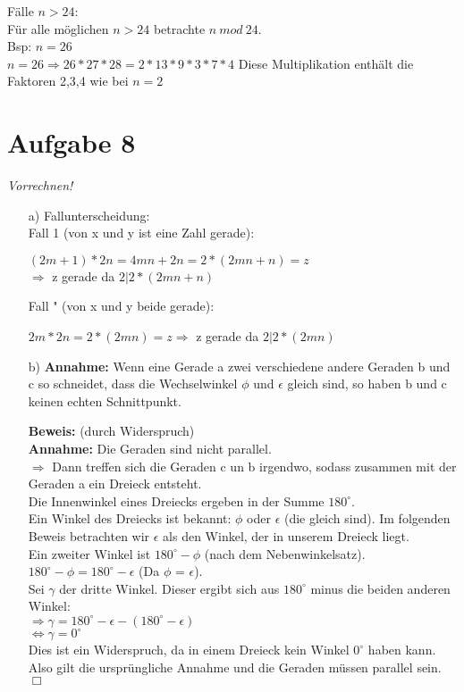 \documentclass[paper = a4, ngerman]{scrartcl}
\begin{document}
\begin{itemize}
			Fälle $n>24$:\\
				Für alle möglichen $n>24$ betrachte $n\ mod\ 24$.\\
				Bsp: $n=26$\\
				$n=26 \Rightarrow 26*27*28 = 2*13*9*3*7*4$
				Diese Multiplikation enthält die Faktoren 2,3,4 wie bei $n=2$
		\end{itemize}
\pagebreak
\section*{Aufgabe 8}
\textit{Vorrechnen!}
	\begin{itemize}
		\item[a)] Fallunterscheidung:\\
		Fall 1 (von x und y ist eine Zahl gerade):
		\begin{center}
			$(2m + 1) * 2n = 4mn + 2n = 2*(2mn + n) = z $\\$\Rightarrow$ z gerade da $2|2*(2mn + n)$
		\end{center}
		Fall " (von x und y beide gerade):
		\begin{center}
			$2m * 2n = 2*(2mn) = z \Rightarrow$ z gerade da $2|2*(2mn)$
		\end{center}
	
		\item[b)]
		\textbf{Annahme:} Wenn eine Gerade a zwei verschiedene andere Geraden b und c so schneidet, dass die Wechselwinkel
		$\phi$ und $\epsilon$ gleich sind, so haben b und c keinen echten Schnittpunkt.
		
		\textbf{Beweis:} (durch Widerspruch)\\
		\textbf{Annahme:} Die Geraden sind nicht parallel.\\
		
		$\Rightarrow$ Dann treffen sich die Geraden c un b irgendwo, sodass zusammen mit der Geraden a ein Dreieck entsteht.\\
		
		Die Innenwinkel eines Dreiecks ergeben in der Summe $180^\circ$.\\
		
		Ein Winkel des Dreiecks ist bekannt: $\phi$ oder $\epsilon$ (die gleich sind). Im folgenden Beweis betrachten wir $\epsilon$ als den Winkel, der in unserem Dreieck liegt.\\
		Ein zweiter Winkel ist $180^\circ - \phi$ (nach dem Nebenwinkelsatz).\\ $180^\circ - \phi = 180^\circ - \epsilon$ (Da $\phi$ = $\epsilon$).\\
		
		Sei $\gamma$ der dritte Winkel. Dieser ergibt sich aus $180^\circ$ minus die beiden anderen Winkel:\\
		$\Rightarrow \gamma = 180^\circ - \epsilon - (180^\circ - \epsilon) $ \\
		$\Leftrightarrow \gamma = 0^\circ$\\
		
		Dies ist ein Widerspruch, da in einem Dreieck kein Winkel $0^\circ$ haben kann. Also gilt die ursprüngliche Annahme und die Geraden müssen parallel sein.
		\hfil$\Box$
	\end{itemize}
\pagebreak
\end{document}

